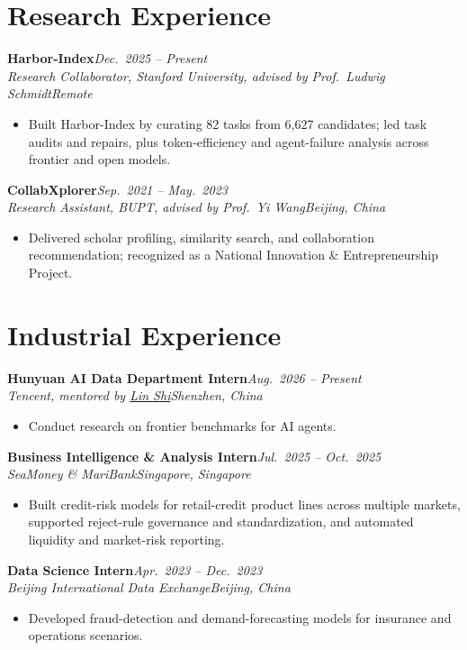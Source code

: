 \documentclass[11pt,a4paper]{article}
\newcommand{\cventry}[4]{%
  \textbf{#1}\hfill\textit{#2}\\[0.1ex]
  \textit{#3}\hfill\textit{#4}\par\vspace{0.2ex}%
}
\begin{document}
\section{Research Experience}
\cventry{Harbor-Index}{Dec.\ 2025 -- Present}
  {Research Collaborator, Stanford University, advised by Prof.\ Ludwig Schmidt}{Remote}
\begin{itemize}
  \item Built Harbor-Index by curating 82 tasks from 6,627 candidates; led task audits and repairs,
        plus token-efficiency and agent-failure analysis across frontier and open models.
\end{itemize}
\cventry{CollabXplorer}{Sep.\ 2021 -- May.\ 2023}
  {Research Assistant, BUPT, advised by Prof.\ Yi Wang}{Beijing, China}
\begin{itemize}
  \item Delivered scholar profiling, similarity search, and collaboration recommendation;
        recognized as a National Innovation \& Entrepreneurship Project.
\end{itemize}

\section{Industrial Experience}
\cventry{Hunyuan AI Data Department Intern}{Aug.\ 2026 -- Present}
  {Tencent, mentored by \href{https://slimshilin.github.io/}{Lin Shi}}{Shenzhen, China}
\begin{itemize}
  \item Conduct research on frontier benchmarks for AI agents.
\end{itemize}
\cventry{Business Intelligence \& Analysis Intern}{Jul.\ 2025 -- Oct.\ 2025}
  {SeaMoney \& MariBank}{Singapore, Singapore}
\begin{itemize}
  \item Built credit-risk models for retail-credit product lines across multiple markets,
        supported reject-rule governance and standardization, and automated liquidity and
        market-risk reporting.
\end{itemize}
\cventry{Data Science Intern}{Apr.\ 2023 -- Dec.\ 2023}
  {Beijing International Data Exchange}{Beijing, China}
\begin{itemize}
  \item Developed fraud-detection and demand-forecasting models for insurance and
        operations scenarios.
\end{itemize}
\end{document}
